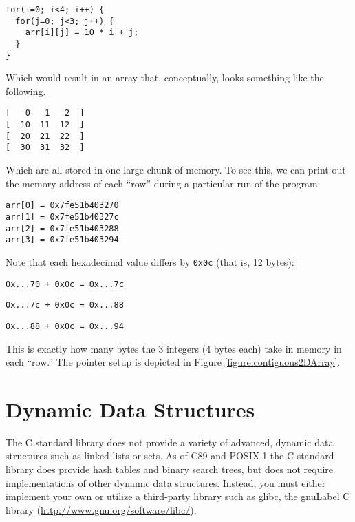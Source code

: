 \begin{verbatim}
for(i=0; i<4; i++) {
  for(j=0; j<3; j++) {
    arr[i][j] = 10 * i + j;
  }
}
\end{verbatim}

Which would result in an array that, conceptually, looks something like
the following.

\begin{verbatim}
[   0   1   2  ]
[  10  11  12  ]
[  20  21  22  ]
[  30  31  32  ]
\end{verbatim}

Which are all stored in one large chunk of memory.  To see this, 
we can print out the memory address of each ``row'' during a
particular run of the program:

\begin{verbatim}
arr[0] = 0x7fe51b403270
arr[1] = 0x7fe51b40327c
arr[2] = 0x7fe51b403288
arr[3] = 0x7fe51b403294
\end{verbatim}

Note that each hexadecimal value differs by \texttt{0x0c}
(that is, 12 bytes): 

\texttt{0x...70 + 0x0c = 0x...7c} 

\texttt{0x...7c + 0x0c = 0x...88}

\texttt{0x...88 + 0x0c = 0x...94}

This is exactly how many bytes the 3 integers (4 bytes each) 
take in memory in each ``row.''  The pointer setup is depicted in
Figure \ref{figure:contiguous2DArray}.



\section{Dynamic Data Structures}

The C standard library does not provide a variety of advanced, dynamic
data structures such as linked lists or sets.  As of C89 and POSIX.1 the
C standard library does provide hash tables and binary search trees, but
does not require implementations of other dynamic data structures.
Instead, you must either implement your own or utilize a third-party 
library such as glibc, the \gls{gnuLabel} C library 
(\url{http://www.gnu.org/software/libc/}).





